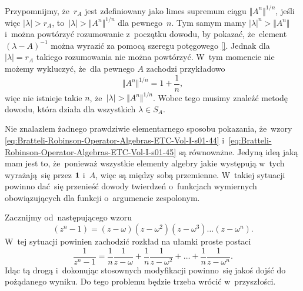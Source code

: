\documentclass[a4paper,11pt]{article}
\begin{document}
Przypomnijmy, że~$r_{ A }$ jest zdefiniowany jako limes supremum ciągu
$\Vert A^{ n }\Vert^{ 1 / n }$, jeśli więc $| \lambda | > r_{ A }$,
to~$| \lambda | > \Vert A^{ n } \Vert^{ 1 / n }$ dla pewnego~$n$. Tym samym mamy
$| \lambda |^{ n } > \Vert A^{ n } \Vert$ i~można powtórzyć rozumowanie z~początku dowodu,
by pokazać, że~element $( \lambda - A )^{ -1 }$ można wyrazić za pomocą szeregu
potęgowego \eqref{}.
Jednak dla $| \lambda | = r_{ A }$ takiego rozumowania nie można powtórzyć. W~tym
momencie nie możemy wykluczyć, że~dla pewnego $A$ zachodzi przykładowo
\begin{equation}
  \label{eq:Bratteli-Robinson-Operator-Algebras-ETC-Vol-I-s01-01}
  \Vert A^{ n } \Vert^{ 1 / n } = 1 + \frac{ 1 }{ n },
\end{equation}
więc nie istnieje takie $n$, że~$| \lambda | > \Vert A^{ n } \Vert^{ 1 / n }$. Wobec tego
musimy znaleźć metodę dowodu, która działa dla wszystkich $\lambda \in S_{ A }$.

Nie znalazłem żadnego prawdziwie elementarnego sposobu pokazania,
że~wzory \eqref{eq:Bratteli-Robinson-Operator-Algebras-ETC-Vol-I-s01-44}
i~\eqref{eq:Bratteli-Robinson-Operator-Algebras-ETC-Vol-I-s01-45} są
równoważne. Jedyną ideą jaką mam jest to, że~ponieważ wszystkie elementy
algebry jakie występują w~tych wyrażają~się przez $\mathbf{1}$ i~$A$, więc są
między sobą przemienne. W~takiej sytuacji powinno dać~się przenieść dowody
twierdzeń o~funkcjach wymiernych obowiązujących dla funkcji o~argumencie
zespolonym.

Zacznijmy od~następującego wzoru
\begin{equation}
  \label{eq:Bratteli-Robinson-Operator-Algebras-ETC-Vol-I-s01-01}
  ( z^{ n } - 1 ) =
  ( z - \omega ) ( z - \omega^{ 2 } ) ( z - \omega^{ 3 } ) \ldots
  ( z - \omega^{ n } ).
\end{equation}
W~tej sytuacji powinien zachodzić rozkład na ułamki proste postaci
\begin{equation}
  \label{eq:Bratteli-Robinson-Operator-Algebras-ETC-Vol-I-s01-01}
  \frac{ 1 }{ z^{ n } - 1 } =
  \frac{ 1 }{ n } \frac{ 1 }{ z - \omega } +
  \frac{ 1 }{ n } \frac{ 1 }{ z - \omega^{ 2 } } + \ldots +
  \frac{ 1 }{ n } \frac{ 1 }{ z - \omega^{ n } }.
\end{equation}
Idąc tą drogą i~dokonując stosownych modyfikacji powinno~się jakoś dojść do
pożądanego wyniku. Do tego problemu będzie trzeba wrócić w~przyszłości.

\vspace{\VerSpaceFour}
\end{document}
